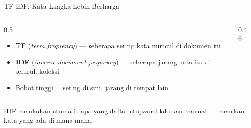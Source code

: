 \documentclass[aspectratio=169,t]{beamer}
\begin{document}
\begin{frame}{TF-IDF: Kata Langka Lebih Berharga}
  \begin{columns}[T]
    \begin{column}{0.5\textwidth}
      \begin{itemize}
        \footnotesize
        \item \textbf{TF} (\emph{term frequency}) --- seberapa sering kata muncul di dokumen ini
        \item \textbf{IDF} (\emph{inverse document frequency}) --- seberapa jarang kata itu di seluruh koleksi
        \item Bobot tinggi = sering di sini, jarang di tempat lain
      \end{itemize}
    \end{column}
    \begin{column}{0.46\textwidth}
      \begin{center}
      \end{center}
    \end{column}
  \end{columns}
  \vspace{0.8em}
  \begin{center}
    {\color{nvlightgreen}\small IDF melakukan otomatis apa yang daftar stopword lakukan manual ---
    menekan kata yang ada di mana-mana.}
  \end{center}
\end{frame}
\end{document}
